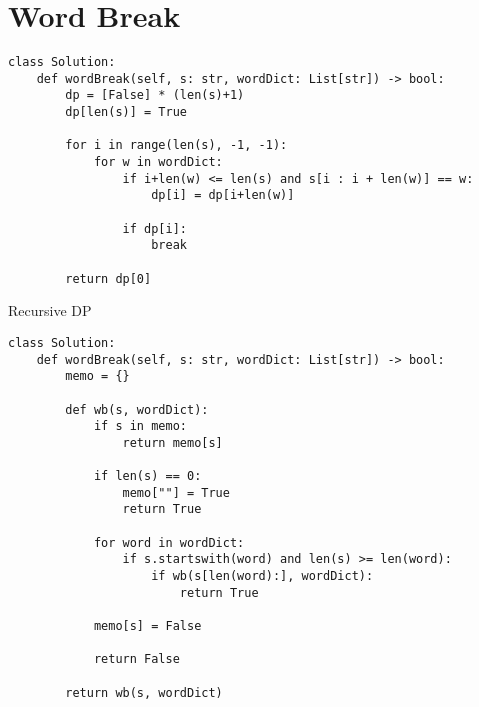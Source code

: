 \documentclass[24pt, a4]{article}
\begin{document}
\section{Word Break}
\begin{lstlisting}
class Solution:
    def wordBreak(self, s: str, wordDict: List[str]) -> bool:
        dp = [False] * (len(s)+1)
        dp[len(s)] = True
        
        for i in range(len(s), -1, -1):
            for w in wordDict:
                if i+len(w) <= len(s) and s[i : i + len(w)] == w:
                    dp[i] = dp[i+len(w)]
                
                if dp[i]:
                    break
        
        return dp[0]
\end{lstlisting}

Recursive DP
\begin{lstlisting}
class Solution:
    def wordBreak(self, s: str, wordDict: List[str]) -> bool:
        memo = {}
        
        def wb(s, wordDict):
            if s in memo:
                return memo[s]
            
            if len(s) == 0:
                memo[""] = True
                return True
            
            for word in wordDict:
                if s.startswith(word) and len(s) >= len(word):
                    if wb(s[len(word):], wordDict):
                        return True
            
            memo[s] = False
            
            return False
        
        return wb(s, wordDict)
\end{lstlisting}
\end{document}
